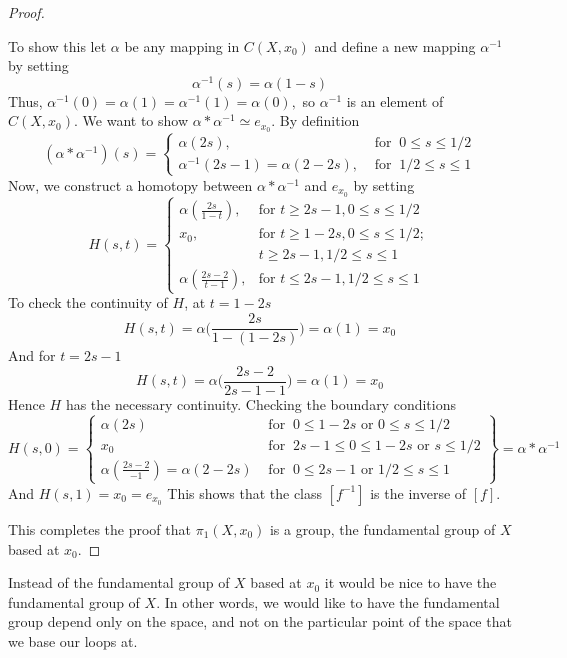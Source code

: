 \begin{proof}
\begin{description}
  To show this let $\alpha$ be any mapping in $C(X,x_0)$ and define a new mapping $\alpha^{-1}$ by setting
  $$\alpha^{-1}(s)=\alpha(1-s)$$
  Thus, $\alpha^{-1}(0)=\alpha(1)=\alpha^{-1}(1)=\alpha(0),$ so $\alpha^{-1}$ is an element of $C(X,x_0)$. We want to show $\alpha\ast\alpha^{-1}\simeq e_{x_0}$. By definition
$$
(\alpha\ast\alpha^{-1})(s)=
\begin{cases}
\alpha(2s),&\mbox{ for }\ 0\leq s\leq 1/2\\
\alpha^{-1}(2s-1)=\alpha(2-2s),&\mbox{ for }\  1/2\leq s\leq1
\end{cases}
$$
Now, we construct a homotopy between $\alpha\ast\alpha^{-1}$ and $e_{x_0}$ by setting
$$
H(s,t)=
\begin{cases}
\alpha(\frac{2s}{1-t}), & \text{for }t\geq 2s-1, 0\leq s\leq 1/2\\
        x_0,  & \text{for } t\geq 1-2s, 0\leq s\leq 1/2 ;\\
                               & t\geq 2s-1, 1/2\leq s\leq 1\\
       \alpha(\frac{2s-2}{t-1}), & \text{for } t\leq 2s-1, 1/2\leq s \leq 1
\end{cases}
$$
To check the continuity of $H$, at $t=1-2s$
$$ H(s,t)=\alpha\biggl(\frac{2s}{1-(1-2s)}\biggl)=\alpha(1)=x_0$$
And for $t=2s-1$
$$ H(s,t)=\alpha\biggl(\frac{2s-2}{2s-1-1}\biggl)=\alpha(1)=x_0$$
Hence $H$ has the necessary continuity. Checking the boundary conditions
\[ H(s,0) = \left\{\begin{array}{lr}
        \alpha(2s) & \text{ for }\ 0\leq 1-2s \text{ or } 0\leq s\leq 1/2 \\
        x_0 & \text{ for }\ 2s-1\leq0\leq1-2s \text{ or }  s\leq 1/2\\
        \alpha(\frac{2s-2}{-1})=\alpha(2-2s) & \text{ for }\ 0\leq 2s-1 \text{ or } 1/2\leq s\leq 1
        \end{array}\right\} = \alpha\ast \alpha^{-1}
\]
And $H(s,1)=x_0=e_{x_0}$
This shows that the class $[f^{-1}]$ is the inverse of $[f]$.
\end{description}
This completes the proof that $\pi_1(X,x_0)$ is a group, the fundamental group of $X$ based at $x_0$.
\end{proof}

Instead of the fundamental group of $X$ based at $x_0$ it would be nice to have the fundamental group of $X$. In other words, we would like to have the fundamental group depend only on the space, and not on the particular point of the space that we base our loops at.

